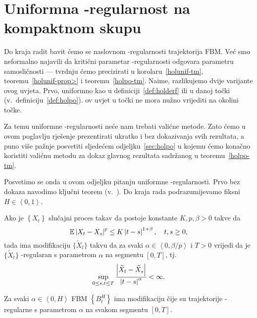 \documentclass[main.tex]{subfiles}
\begin{document}
\nocite{*}

\section{Uniformna \holder -regularnost na kompaktnom skupu}\label{sec:holunif}
Do kraja radit bavit ćemo se naslovnom \holder -regularnosti
trajektorija FBM. Već smo neformalno najavili da kritični parametar \holder -regularnosti
odgovara parametru samosličnosti --- tvrdnju ćemo precizirati u
korolaru~\ref{holunif-tm}, teoremu~\ref{holunif-prop>} i teoremu~\ref{holpo-tm}. Naime,
razlikujemo dvije varijante \holder ovog uvjeta. Prvo, uniformno
kao u definiciji~\ref{def:holderf} ili u danoj točki
(v.\ definiciju~\ref{def:holpo}). \holder ov uvjet u točki ne mora nužno
vrijediti na okolini točke.

Za temu uniformne \holder -regularnosti neće nam trebati
valićne metode. Zato ćemo u ovom poglavlju rješenje prezentirati
ukratko i bez dokazivanja svih rezultata, a puno više pažnje
posvetiti sljedećem odjeljku~\ref{sec:holpo} u kojemu
ćemo konačno koristiti valićnu metodu za dokaz glavnog rezultata sadržanog
u teoremu~\ref{holpo-tm}.

Posvetimo se onda u ovom odjeljku pitanju uniformne \holder -regularnosti.
Prvo bez dokaza navodimo ključni teorem (v.~\cite[tm.~3.1]{se}). Do kraja
rada podrazumijevamo fiksni \( H \in \left\langle 0,1 \right\rangle \).

\begin{teorem}\label{holunif-setm}
	Ako je \( \left\{ X_t \right\} \) slučajni proces takav da
	postoje konstante \( K, p, \beta > 0 \) takve da
	\begin{equation}
		\mathbb{E} \left| {X_t-X_s} \right|^p \le K \left| {t-s} \right|^{1+\beta}, \quad t,s \ge 0,
	\end{equation}
	tada ima modifikaciju \( \bigl\{ \widetilde X_t \bigr\} \)
	takvu da za svaki \( \alpha \in \left\langle 0, \beta/p \right\rangle \)
	i \( T > 0 \) vrijedi da je \( \bigl\{ \widetilde X_t \bigr\} \)
	\holder-regularan s parametrom \( \alpha \) na segmentu \( \left[ 0,T \right] \), tj.\
	\begin{equation}
		\sup\limits_{0 \le s, t \le T}
		\frac{\left| {\widetilde X_t-\widetilde X_s} \right|}{\left| {t-s} \right|^\alpha} < \infty.
	\end{equation}
\end{teorem}

\begin{korolar}\label{holunif-tm}
	Za svaki \( \alpha \in \left\langle0,H\right\rangle  \) FBM \( \left\{ B^H_t \right\} \) ima modifikaciju
	čije su trajektorije \holder -regularne s parametrom \( \alpha \) na svakom segmentu
	\( \left[ 0,T \right] \).
\end{korolar}
\end{document}
